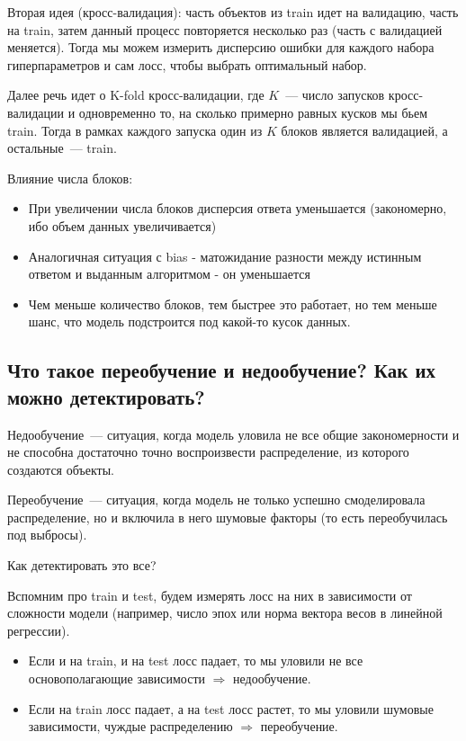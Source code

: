 Вторая идея (кросс-валидация): часть объектов из train идет на валидацию, часть на train, затем данный процесс повторяется несколько раз (часть с валидацией меняется). Тогда мы можем измерить дисперсию ошибки для каждого набора гиперпараметров и сам лосс, чтобы выбрать оптимальный набор.

\begin{note}
    Далее речь идет о K-fold кросс-валидации, где $K$~--- число запусков кросс-валидации и одновременно то, на сколько примерно равных кусков мы бьем train. Тогда в рамках каждого запуска один из $K$ блоков является валидацией, а остальные~--- train.
\end{note}


Влияние числа блоков:

\begin{itemize}
    \item При увеличении числа блоков дисперсия ответа уменьшается (закономерно, ибо объем данных увеличивается)
    \item Аналогичная ситуация с bias - матожидание разности между истинным ответом и выданным алгоритмом - он уменьшается
    \item Чем меньше количество блоков, тем быстрее это работает, но тем меньше шанс, что модель подстроится под какой-то кусок данных.
\end{itemize}








\subsection{Что такое переобучение и недообучение? Как их можно детектировать?}

\begin{definition}
    Недообучение~--- ситуация, когда модель уловила не все общие закономерности и не способна достаточно точно воспроизвести распределение, из которого создаются объекты.
\end{definition}

\begin{definition}
    Переобучение~--- ситуация, когда модель не только успешно смоделировала распределение, но и включила в него шумовые факторы (то есть переобучилась под выбросы).
\end{definition}

Как детектировать это все?

Вспомним про train и test, будем измерять лосс на них в зависимости от сложности модели (например, число эпох или норма вектора весов в линейной регрессии).
\begin{itemize}
    \item Если и на train, и на test лосс падает, то мы уловили не все основополагающие зависимости $\Longrightarrow$ недообучение.
    \item Если на train лосс падает, а на test лосс растет, то мы уловили шумовые зависимости, чуждые распределению $\Longrightarrow$ переобучение.
\end{itemize}











